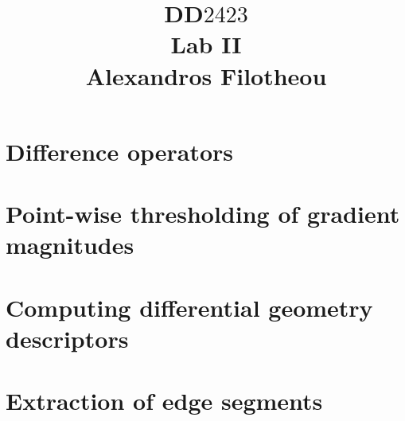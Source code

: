 \documentclass[oneside,12pt]{article}
\title{DD$2423$ \\ Lab II \\ Alexandros Filotheou}
\date{}
\begin{document}
	\maketitle

	\section{Difference operators}
		
		\newpage

	\section{Point-wise thresholding of gradient magnitudes}
		
		\newpage

	\section{Computing differential geometry descriptors}
		
		\newpage

	\section{Extraction of edge segments}
		
		\newpage
\end{document}
